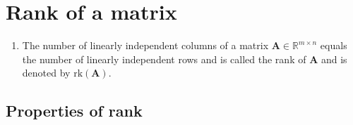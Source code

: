 \section{Rank of a matrix}

\begin{enumerate}
    \item 
    \begin{definition}
        The number of linearly independent columns of a matrix $\bm{A} \in \mathbb{R}^{m\times n}$ equals the number of linearly independent rows and is called the rank of $\bm{A}$ and is denoted by $\text{rk}(\bm{A})$.
        \hfill \cite{mfml/book/mml/Deisenroth-Faisal-Ong}
    \end{definition}

\end{enumerate}


\subsection{Properties of rank}


